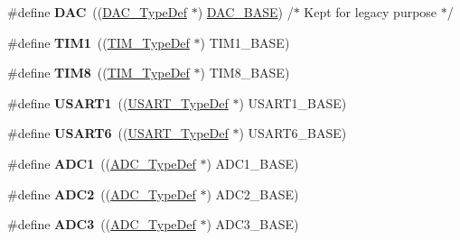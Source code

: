 \begin{DoxyCompactItemize}
\#define {\bfseries D\+AC}~((\mbox{\hyperlink{struct_d_a_c___type_def}{D\+A\+C\+\_\+\+Type\+Def}} $\ast$) \mbox{\hyperlink{group___peripheral__memory__map_gad18d0b914c7f68cecbee1a2d23a67d38}{D\+A\+C\+\_\+\+B\+A\+SE}}) /$\ast$ Kept for legacy purpose $\ast$/
\item 
\mbox{\label{group___peripheral__declaration_ga2e87451fea8dc9380056d3cfc5ed81fb}} 
\#define {\bfseries T\+I\+M1}~((\mbox{\hyperlink{struct_t_i_m___type_def}{T\+I\+M\+\_\+\+Type\+Def}} $\ast$) T\+I\+M1\+\_\+\+B\+A\+SE)
\item 
\mbox{\label{group___peripheral__declaration_ga9a3660400b17735e91331f256095810e}} 
\#define {\bfseries T\+I\+M8}~((\mbox{\hyperlink{struct_t_i_m___type_def}{T\+I\+M\+\_\+\+Type\+Def}} $\ast$) T\+I\+M8\+\_\+\+B\+A\+SE)
\item 
\mbox{\label{group___peripheral__declaration_ga92871691058ff7ccffd7635930cb08da}} 
\#define {\bfseries U\+S\+A\+R\+T1}~((\mbox{\hyperlink{struct_u_s_a_r_t___type_def}{U\+S\+A\+R\+T\+\_\+\+Type\+Def}} $\ast$) U\+S\+A\+R\+T1\+\_\+\+B\+A\+SE)
\item 
\mbox{\label{group___peripheral__declaration_ga2dab39a19ce3dd05fe360dcbb7b5dc84}} 
\#define {\bfseries U\+S\+A\+R\+T6}~((\mbox{\hyperlink{struct_u_s_a_r_t___type_def}{U\+S\+A\+R\+T\+\_\+\+Type\+Def}} $\ast$) U\+S\+A\+R\+T6\+\_\+\+B\+A\+SE)
\item 
\mbox{\label{group___peripheral__declaration_ga90d2d5c526ce5c0a551f533eccbee71a}} 
\#define {\bfseries A\+D\+C1}~((\mbox{\hyperlink{struct_a_d_c___type_def}{A\+D\+C\+\_\+\+Type\+Def}} $\ast$) A\+D\+C1\+\_\+\+B\+A\+SE)
\item 
\mbox{\label{group___peripheral__declaration_gac5503ae96c26b4475226f96715a1bf1e}} 
\#define {\bfseries A\+D\+C2}~((\mbox{\hyperlink{struct_a_d_c___type_def}{A\+D\+C\+\_\+\+Type\+Def}} $\ast$) A\+D\+C2\+\_\+\+B\+A\+SE)
\item 
\mbox{\label{group___peripheral__declaration_gae917784606daf6b04c9b7b96b40c2f74}} 
\#define {\bfseries A\+D\+C3}~((\mbox{\hyperlink{struct_a_d_c___type_def}{A\+D\+C\+\_\+\+Type\+Def}} $\ast$) A\+D\+C3\+\_\+\+B\+A\+SE)

\end{DoxyCompactItemize}
